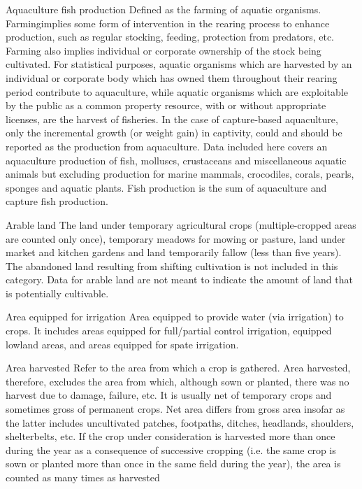 \begin{MetadataCollection} {}
\begin{metadata}{Aquaculture fish production} {}
Defined as the farming of aquatic organisms. Farmingimplies some form of intervention in the rearing process to enhance production, such as regular stocking, feeding, protection from predators, etc. Farming also implies individual or corporate ownership of the stock being cultivated. For statistical purposes, aquatic organisms which are harvested by an individual or corporate body which has owned them throughout their rearing period contribute to aquaculture, while aquatic organisms which are exploitable by the public as a common property resource, with or without appropriate licenses, are the harvest of fisheries. In the case of capture-based aquaculture, only the incremental growth (or weight gain) in captivity, could and should be reported as the production from aquaculture. Data included here covers an aquaculture production of fish, molluscs, crustaceans and miscellaneous aquatic animals but excluding production for marine mammals, crocodiles, corals, pearls, sponges and aquatic plants. Fish production is the sum of aquaculture and capture fish production.
\end{metadata}

\begin{metadata}{Arable land} {}
The land under temporary agricultural crops (multiple-cropped areas are counted only once), temporary meadows for mowing or pasture, land under market and kitchen gardens and land temporarily fallow (less than five years). The abandoned land resulting from shifting cultivation is not included in this category. Data for arable land are not meant to indicate the amount of land that is potentially cultivable.
\end{metadata}

\begin{metadata}{Area equipped for irrigation} {}
Area equipped to provide water (via irrigation) to crops. It includes areas equipped for full/partial control irrigation, equipped lowland areas, and areas equipped for spate irrigation.
\end{metadata}

\begin{metadata}{Area harvested} {}
Refer to the area from which a crop is gathered. Area harvested, therefore, excludes the area from which, although sown or planted, there was no harvest due to damage, failure, etc. It is usually net of temporary crops and sometimes gross of permanent crops. Net area differs from gross area insofar as the latter includes uncultivated patches, footpaths, ditches, headlands, shoulders, shelterbelts, etc. If the crop under consideration is harvested more than once during the year as a consequence of successive cropping (i.e. the same crop is sown or planted more than once in the same field during the year), the area is counted as many times as harvested
\end{metadata}


\end{MetadataCollection}
